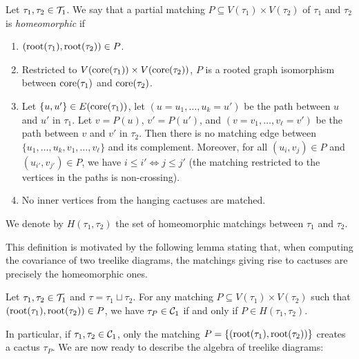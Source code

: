 \begin{definition}\label{def:homeomorphic}
    Let $\tau_1,\tau_2\in{\cal T}_1$. We
    say that a partial matching
    $P\subseteq V(\tau_1)\times V(\tau_2)$ of $\tau_1$ and $\tau_2$ is
    {\em homeomorphic} if
    \begin{enumerate}
        \item $(\textnormal{root}(\tau_1),\textnormal{root}(\tau_2))\in P$.
        \item Restricted to $V(\textnormal{core}(\tau_1))\times V(\textnormal{core}(\tau_2))$, $P$ is a rooted graph isomorphism between $\textnormal{core}(\tau_1)$ and $\textnormal{core}(\tau_2)$.

        \item Let $\{u,u'\}\in E(\textnormal{core}(\tau_1))$,
        let $(u=u_1, \ldots, u_k=u')$ be the path between $u$ and $u'$ in $\tau_1$. Let $v=P(u)$,  $v'=P(u')$, and $(v=v_1,\ldots,v_\ell=v')$ be the
        path between $v$ and $v'$ in $\tau_2$.
        Then there is no matching edge between
        $\{u_1, \ldots, u_k,v_1,\ldots,v_\ell\}$
        and its complement.
        Moreover,
        for all $(u_i,v_j)\in P$ and $(u_{i'},v_{j'})\in P$, we have $i\le i' \iff j\le j'$ (the matching restricted to the vertices in the paths is non-crossing).

        \item No inner vertices from the 
        hanging cactuses are matched.
    \end{enumerate}
    We denote by $H(\tau_1,\tau_2)$ the set
    of homeomorphic matchings between
    $\tau_1$ and $\tau_2$. 
\end{definition}

\noindent This definition
is motivated by the following lemma 
stating that, when 
computing the covariance of two treelike
diagrams, the matchings giving rise to
cactuses are precisely the homeomorphic ones.

\begin{lemma}
    \label{lem:homeomorphic}
    Let $\tau_1,\tau_2\in{\cal T}_1$ and $\tau = \tau_1 \sqcup \tau_2$.
    For any matching $P\subseteq V(\tau_1)\times V(\tau_2)$ such that $(\textnormal{root}(\tau_1), \textnormal{root}(\tau_2)) \in P$, we have $\tau_P\in{\cal C}_1$ if and only
    if $P\in H(\tau_1,\tau_2)$.
\end{lemma}

\noindent In particular, if $\tau_1, \tau_2 \in {\cal C}_1$, only the matching $P = \{(\textnormal{root}(\tau_1), \textnormal{root}(\tau_2))\}$ creates a cactus $\tau_P$.
We are now ready to describe the algebra of
treelike diagrams:

